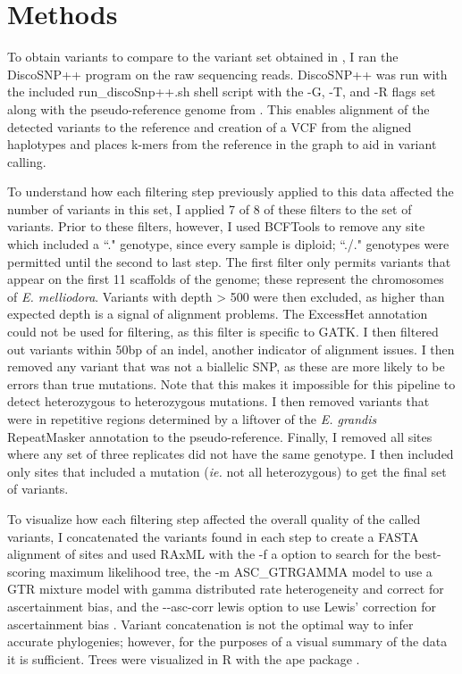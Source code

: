 \section{Methods}

To obtain variants to compare to the variant set obtained in \cite{orr_phylogenomic_2020}, I ran the DiscoSNP++ program on the raw sequencing reads. DiscoSNP++ was run with the included run\_discoSnp++.sh shell script with the -G, -T, and -R flags set along with the pseudo-reference genome from \cite{orr_phylogenomic_2020}. This enables alignment of the detected variants to the reference and creation of a VCF from the aligned haplotypes and places k-mers from the reference in the graph to aid in variant calling.

To understand how each filtering step previously applied to this data affected the number of variants in this set, I applied 7 of 8 of these filters to the set of variants. Prior to these filters, however, I used BCFTools \parencite{li_statistical_2011} to remove any site which included a ``." genotype, since every sample is diploid; ``./." genotypes were permitted until the second to last step. The first filter only permits variants that appear on the first 11 scaffolds of the genome; these represent the chromosomes of \textit{E. melliodora}. Variants with depth > 500 were then excluded, as higher than expected depth is a signal of alignment problems. The ExcessHet annotation could not be used for filtering, as this filter is specific to GATK. I then filtered out variants within 50bp of an indel, another indicator of alignment issues. I then removed any variant that was not a biallelic SNP, as these are more likely to be errors than true mutations. Note that this makes it impossible for this pipeline to detect heterozygous to heterozygous mutations. I then removed variants that were in repetitive regions determined by a liftover of the \textit{E. grandis} RepeatMasker annotation \parencite{bartholome_high-resolution_2015} to the pseudo-reference. Finally, I removed all sites where any set of three replicates did not have the same genotype. I then included only sites that included a mutation (\textit{ie.} not all heterozygous) to get the final set of variants.

To visualize how each filtering step affected the overall quality of the called variants, I concatenated the variants found in each step to create a FASTA alignment of sites and used RAxML \parencite{stamatakis_raxml_2014} with the -f a option to search for the best-scoring maximum likelihood tree, the -m ASC\_GTRGAMMA model to use a GTR mixture model with gamma distributed rate heterogeneity and correct for ascertainment bias, and the -\phantom{}-asc-corr lewis option to use Lewis' correction for ascertainment bias \parencite{lewis_likelihood_2001}. Variant concatenation is not the optimal way to infer accurate phylogenies; however, for the purposes of a visual summary of the data it is sufficient. Trees were visualized in R \parencite{r_core_2020} with the ape package \parencite{paradis_ape_2019}.

